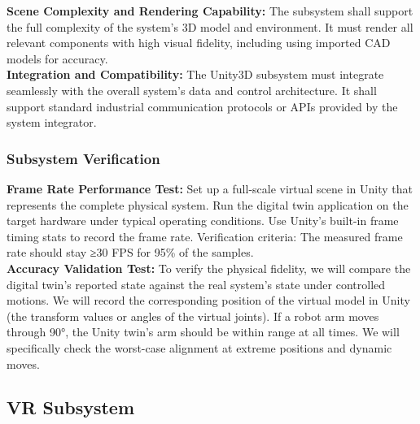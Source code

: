 \documentclass{senior-design}
\begin{document}
\textbf{Scene Complexity and Rendering Capability:} The subsystem shall support the full 
complexity of the system's 3D model and environment. It must render all relevant 
components with high visual fidelity, including using imported CAD models for 
accuracy​. 
\\
  
\textbf{Integration and Compatibility:} The Unity3D subsystem must integrate seamlessly 
with the overall system's data and control architecture. It shall support 
standard industrial communication protocols or APIs provided by the system 
integrator. 
\subsubsection*{Subsystem Verification}
\textbf{Frame Rate Performance Test:} Set up a full-scale virtual scene in Unity that 
represents the complete physical system. Run the digital twin application on 
the target hardware under typical operating conditions. Use Unity's built-in 
frame timing stats to record the frame rate. Verification criteria: The 
measured frame rate should stay ≥30 FPS for 95\% of the samples. 
\\
  
\textbf{Accuracy Validation Test:} To verify the physical fidelity, we will compare 
the digital twin's reported state against the real system's state under 
controlled motions. We will record the corresponding position of the virtual 
model in Unity (the transform values or angles of the virtual joints). If a 
robot arm moves through 90°, the Unity twin's arm should be within range at 
all times. We will specifically check the worst-case alignment at extreme 
positions and dynamic moves. 
\subsection{VR Subsystem}
\end{document}
